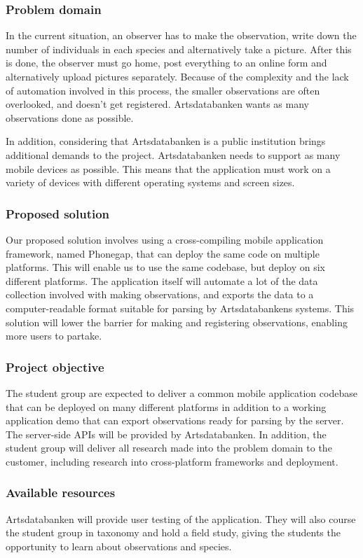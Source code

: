 \subsubsection{Problem domain}
In the current situation, an observer has to make the observation, write down
the number of individuals in each species and alternatively take a picture. After this is done,
the observer must go home, post everything to an online form and
alternatively upload pictures separately. Because of the complexity and the
lack of automation involved in this process, the smaller observations are often
overlooked, and doesn't get registered. Artsdatabanken wants as many
observations done as possible.

In addition, considering that Artsdatabanken is a public institution brings
additional demands to the project. Artsdatabanken needs to support as many
mobile devices as possible. This means that the application must work on
a variety of devices with different operating systems and screen sizes.

\subsubsection{Proposed solution}
Our proposed solution involves using a cross-compiling mobile application
framework, named Phonegap, that can deploy the same code on multiple platforms.
This will enable us to use the same codebase, but deploy on six different
platforms. The application itself will automate a lot of the data collection
involved with making observations, and exports the data to a computer-readable
format suitable for parsing by Artsdatabankens systems. This solution will
lower the barrier for making and registering observations, enabling more users
to partake.

\subsubsection{Project objective}
The student group are expected to deliver a common mobile application codebase
that can be deployed on many different platforms in addition to a working
application demo that can export observations ready for parsing by the server.
The server-side APIs will be provided by Artsdatabanken. In addition, the
student group will deliver all research made into the problem domain to the
customer, including research into cross-platform frameworks and deployment.

\subsubsection{Available resources}
Artsdatabanken will provide user testing of the application. They will also
course the student group in taxonomy and hold a field study, giving the
students the opportunity to learn about observations and species.

